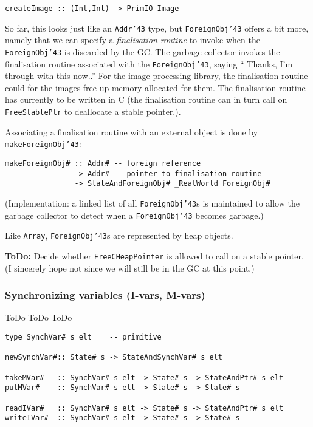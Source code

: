 \begin{verbatim}
createImage :: (Int,Int) -> PrimIO Image
\end{verbatim}

So far, this looks just like an \mbox{\tt Addr{\char'43}} type, but \mbox{\tt ForeignObj{\char'43}}
offers a bit more, namely that we can specify a {\em finalisation
routine} to invoke when the \mbox{\tt ForeignObj{\char'43}} is discarded by the
GC. The garbage collector invokes the finalisation routine associated
with the \mbox{\tt ForeignObj{\char'43}}, saying `` Thanks, I'm through with this
now..'' For the image-processing library, the finalisation routine could for
the images free up memory allocated for them. The finalisation routine has
currently to be written in C (the finalisation routine can in turn call on
\mbox{\tt FreeStablePtr} to deallocate a stable pointer.).

Associating a finalisation routine with an external object is done by 
\mbox{\tt makeForeignObj{\char'43}}:

\begin{verbatim}
makeForeignObj# :: Addr# -- foreign reference
                -> Addr# -- pointer to finalisation routine
                -> StateAndForeignObj# _RealWorld ForeignObj#
\end{verbatim}

(Implementation: a linked list of all \mbox{\tt ForeignObj{\char'43}}s is maintained to allow the
 garbage collector to detect when a \mbox{\tt ForeignObj{\char'43}} becomes garbage.)

Like \mbox{\tt Array}, \mbox{\tt ForeignObj{\char'43}}s are represented by heap objects.

{\bf ToDo:} Decide whether \mbox{\tt FreeCHeapPointer} is allowed to call on a
stable pointer. (I sincerely hope not since we will still be in the
GC at this point.)

\subsubsection{Synchronizing variables (I-vars, M-vars)}

ToDo ToDo ToDo

\begin{verbatim}
type SynchVar# s elt    -- primitive

newSynchVar#:: State# s -> StateAndSynchVar# s elt

takeMVar#   :: SynchVar# s elt -> State# s -> StateAndPtr# s elt
putMVar#    :: SynchVar# s elt -> State# s -> State# s

readIVar#   :: SynchVar# s elt -> State# s -> StateAndPtr# s elt
writeIVar#  :: SynchVar# s elt -> State# s -> State# s
\end{verbatim}

